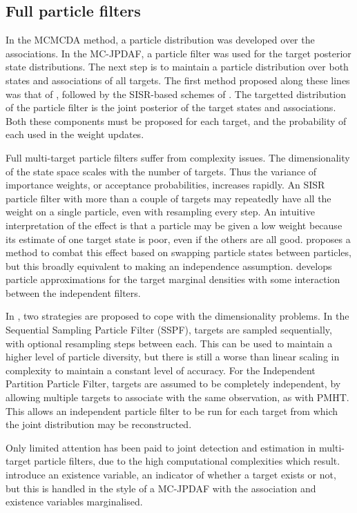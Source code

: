 \subsection{Full particle filters}
In the MCMCDA method, a particle distribution was developed over the associations. In the MC-JPDAF, a particle filter was used for the target posterior state distributions. The next step is to maintain a particle distribution over both states and associations of all targets. The first method proposed along these lines was that of \cite{Hue2002}, followed by the SISR-based schemes of \cite{Doucet2002,Vermaak2005}. The targetted distribution of the particle filter is the joint posterior of the target states and associations. Both these components must be proposed for each target, and the probability of each used in the weight updates.

Full multi-target particle filters suffer from complexity issues. The dimensionality of the state space scales with the number of targets. Thus the variance of importance weights, or acceptance probabilities, increases rapidly. An SISR particle filter with more than a couple of targets may repeatedly have all the weight on a single particle, even with resampling every step. An intuitive interpretation of the effect is that a particle may be given a low weight because its estimate of one target state is poor, even if the others are all good. \cite{Orton2002} proposes a method to combat this effect based on swapping particle states between particles, but this broadly equivalent to making an independence assumption. \cite{Maskell2003} develops particle approximations for the target marginal densities with some interaction between the independent filters.

In \cite{Vermaak2005}, two strategies are proposed to cope with the dimensionality problems. In the Sequential Sampling Particle Filter (SSPF), targets are sampled sequentially, with optional resampling steps between each. This can be used to maintain a higher level of particle diversity, but there is still a worse than linear scaling in complexity to maintain a constant level of accuracy. For the Independent Partition Particle Filter, targets are assumed to be completely independent, by allowing multiple targets to associate with the same observation, as with PMHT. This allows an independent particle filter to be run for each target from which the joint distribution may be reconstructed.

Only limited attention has been paid to joint detection and estimation in multi-target particle filters, due to the high computational complexities which result. \cite{Vermaak2005,Horridge2009} introduce an existence variable, an indicator of whether a target exists or not, but this is handled in the style of a MC-JPDAF with the association and existence variables marginalised.

